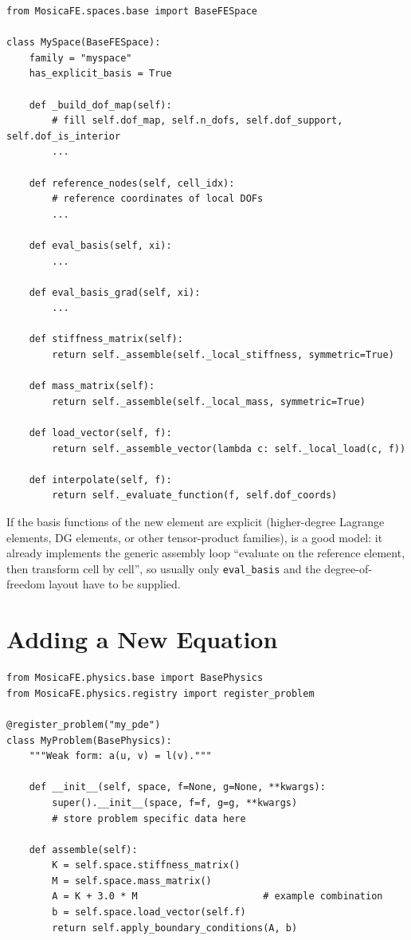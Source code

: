 \documentclass[11pt,oneside]{book}
\theoremstyle{definition}
\theoremstyle{plain}
\newenvironment{important}{%
  \begin{tcolorbox}[colback=blue!5,colframe=blue!45,title=Key Point,fonttitle=\bfseries]%
}{%
  \end{tcolorbox}%
}
\newcommand{\code}[1]{\texttt{#1}}
\begin{document}
\begin{lstlisting}[language=MosicaFE,caption={Skeleton of an explicit-basis space},label={lst:newspace}]
from MosicaFE.spaces.base import BaseFESpace

class MySpace(BaseFESpace):
    family = "myspace"
    has_explicit_basis = True

    def _build_dof_map(self):
        # fill self.dof_map, self.n_dofs, self.dof_support, self.dof_is_interior
        ...

    def reference_nodes(self, cell_idx):
        # reference coordinates of local DOFs
        ...

    def eval_basis(self, xi):
        ...

    def eval_basis_grad(self, xi):
        ...

    def stiffness_matrix(self):
        return self._assemble(self._local_stiffness, symmetric=True)

    def mass_matrix(self):
        return self._assemble(self._local_mass, symmetric=True)

    def load_vector(self, f):
        return self._assemble_vector(lambda c: self._local_load(c, f))

    def interpolate(self, f):
        return self._evaluate_function(f, self.dof_coords)
\end{lstlisting}

\begin{important}
If the basis functions of the new element are explicit (higher-degree Lagrange
elements, DG elements, or other tensor-product families), 
is a good model: it already implements the generic assembly loop ``evaluate on the
reference element, then transform cell by cell'', so usually only \code{eval\_\allowbreak basis}
and the degree-of-freedom layout have to be supplied.
\end{important}

\section{Adding a New Equation}

\begin{lstlisting}[language=MosicaFE,caption={Template for a new PDE},label={lst:newpde}]
from MosicaFE.physics.base import BasePhysics
from MosicaFE.physics.registry import register_problem

@register_problem("my_pde")
class MyProblem(BasePhysics):
    """Weak form: a(u, v) = l(v)."""

    def __init__(self, space, f=None, g=None, **kwargs):
        super().__init__(space, f=f, g=g, **kwargs)
        # store problem specific data here

    def assemble(self):
        K = self.space.stiffness_matrix()
        M = self.space.mass_matrix()
        A = K + 3.0 * M                      # example combination
        b = self.space.load_vector(self.f)
        return self.apply_boundary_conditions(A, b)
\end{lstlisting}
\end{document}
